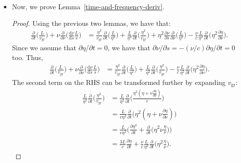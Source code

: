 \documentclass[10pt]{article}
\newcommand{\dee}{\mathrm{d}}
\newcommand{\group}{\mathrm{gr}}
\begin{document}
\begin{itemize}
    \item Now, we prove Lemma~\ref{time-and-frequency-deriv}.
    \begin{proof}
      Using the previous two lemmas, we have that:
      \begin{align*}
        \frac{\partial}{\partial t} \bigg( \frac{L}{v_\group} \bigg)
        +\nu \frac{\partial }{\partial \nu} \bigg( \frac{\dee \nu}{\dee s} \frac{L}{s} \bigg)
        &= \frac{\eta^2}{v_\group} \frac{\partial}{\partial t} \bigg( \frac{L}{\eta^2} \bigg)
        + \frac{L}{\eta^2} \frac{\partial}{\partial t} \bigg( \frac{\eta^2}{v_\group}
        \bigg)
        + \eta^2 \frac{\partial \nu}{\partial s} \frac{\partial }{\partial \nu} \bigg( \frac{L}{\eta^2} \bigg)
        - \frac{\nu}{c} \frac{L}{\eta^2} \frac{\partial }{\partial t} \bigg( \eta^2 \frac{\partial \eta}{\partial \nu} \bigg).
      \end{align*}
      Since we assume that $\partial \eta / \partial t = 0$, we have that $\partial \nu / \partial s = -(\nu/c) \partial \eta / \partial t = 0$ too. Thus,
      \begin{align*}
        \frac{\partial}{\partial t} \bigg( \frac{L}{v_\group} \bigg)
        +\nu \frac{\partial }{\partial \nu} \bigg( \frac{\dee \nu}{\dee s} \frac{L}{s} \bigg)
        &= \frac{\eta^2}{v_\group} \frac{\partial}{\partial t} \bigg( \frac{L}{\eta^2} \bigg)
        + \frac{L}{\eta^2} \frac{\partial}{\partial t} \bigg( \frac{\eta^2}{v_\group}
        \bigg)        
        - \frac{\nu}{c} \frac{L}{\eta^2} \frac{\partial }{\partial t} \bigg( \eta^2 \frac{\partial \eta}{\partial \nu} \bigg).
      \end{align*}
      The second term on the RHS can be transformed further by expanding $v_\group$:
      \begin{align*}
        \frac{L}{\eta^2} \frac{\partial}{\partial t} \bigg( \frac{\eta^2}{v_\group}
        \bigg)
        &= \frac{L}{\eta^2} \frac{\partial}{\partial t} \bigg( \frac{\eta^2(\eta + \nu \frac{\partial \eta}{\partial \nu})}{c} \bigg)\\
        &= \frac{L}{c \eta^2} \frac{\partial}{\partial t} \bigg( \eta^2(\eta + \nu \frac{\partial \eta}{\partial \nu}) \bigg)\\
        &= \frac{L}{c \eta^2} \bigg( \frac{\partial \eta^3}{\partial t} + \frac{\partial }{\partial t}\bigg( \eta^2 \nu \frac{\eta}{\nu}\bigg) \bigg)\\
        &= \frac{3L}{c}  \frac{\partial \eta}{\partial t} + \frac{\nu}{c} \frac{L}{\eta^2} \frac{\partial }{\partial t}\bigg( \eta^2 \frac{\eta}{\nu}\bigg).

\end{align*}
\end{proof}
\end{itemize}
\end{document}
